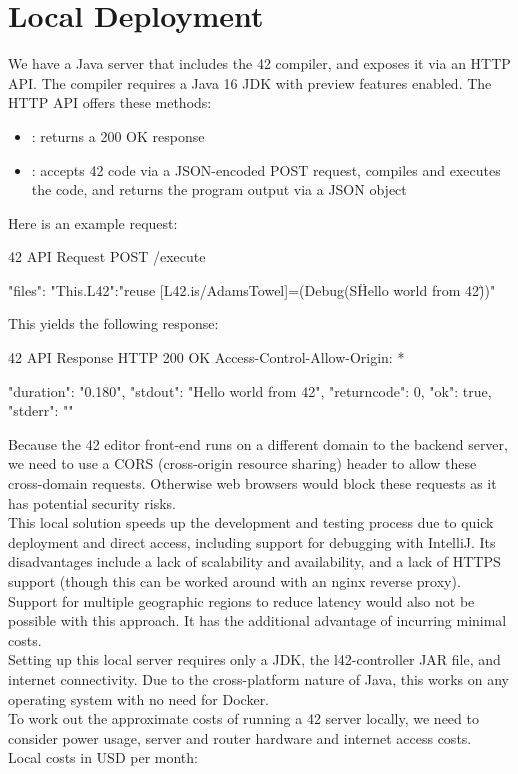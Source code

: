 \section{Local Deployment}

We have a Java server that includes the 42 compiler, and exposes it via an HTTP API. The compiler requires a Java 16 JDK with preview features enabled. The HTTP API offers these methods:

\begin{itemize}
\item {}: returns a 200 OK response
\item {}: accepts 42 code via a JSON-encoded POST request, compiles and executes the code, and returns the program output via a JSON object
\end{itemize}

Here is an example request:
\begin{mylisting}{42 API Request}
POST /execute

{
    "files": {
        "This.L42":"reuse [L42.is/AdamsTowel]\nMain=(\n  Debug(S\"Hello world from 42\")\n  )"
    }
}
\end{mylisting}

This yields the following response:
\begin{mylisting}{42 API Response}
HTTP 200 OK
Access-Control-Allow-Origin: *

{
    "duration": "0.180",
    "stdout": "Hello world from 42\n",
    "returncode": 0,
    "ok": true,
    "stderr": ""
}
\end{mylisting}

Because the 42 editor front-end runs on a different domain to the backend server, we need to use a CORS (cross-origin resource sharing) header to allow these cross-domain requests. Otherwise web browsers would block these requests as it has potential security risks.
\\[12pt]
This local solution speeds up the development and testing process due to quick deployment and direct access, including support for debugging with IntelliJ. Its disadvantages include a lack of scalability and availability, and a lack of HTTPS support (though this can be worked around with an nginx reverse proxy). Support for multiple geographic regions to reduce latency would also not be possible with this approach. It has the additional advantage of incurring minimal costs.
\\[12pt]
Setting up this local server requires only a JDK, the l42-controller JAR file, and internet connectivity. Due to the cross-platform nature of Java, this works on any operating system with no need for Docker.
\\[12pt]
To work out the approximate costs of running a 42 server locally, we need to consider power usage, server and router hardware and internet access costs.
\\[12pt]
Local costs in USD per month:

